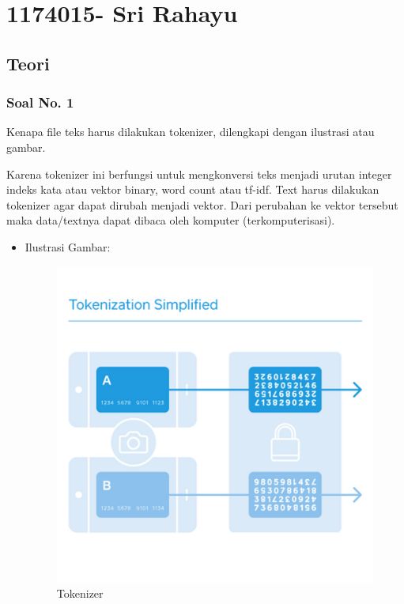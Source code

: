 \section{1174015- Sri Rahayu}
\subsection{Teori}
\subsubsection{Soal No. 1}
Kenapa file teks harus dilakukan tokenizer, dilengkapi dengan ilustrasi atau gambar.

Karena tokenizer ini berfungsi untuk mengkonversi teks menjadi urutan integer indeks kata atau vektor binary, word count atau tf-idf. Text harus dilakukan tokenizer agar dapat dirubah menjadi vektor. Dari perubahan ke vektor tersebut maka data/textnya dapat dibaca oleh komputer (terkomputerisasi).

\begin{itemize}
\item Ilustrasi Gambar:

\begin{figure}[!hbtp]
\centering
\includegraphics[scale=0.2]{figures/1174015/7/1.jpg}
\caption{Tokenizer}
\end{figure}

\end{itemize}

